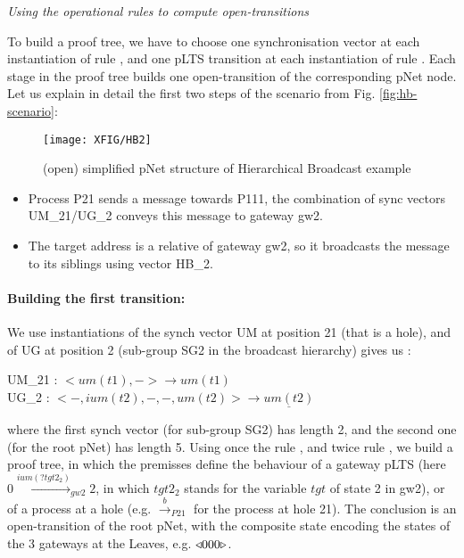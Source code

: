 \documentclass{lncs/llncs}
\newcommand{\TODO}[1]{\textcolor{red}{\textbf{[TODO:#1]}}}
\begin{document}
\begin{example} \emph{Using the operational rules to compute
    open-transitions}
  \label{example:deduction-trees}

To build a proof tree, we have to choose one synchronisation vector at
each instantiation of rule \TrDeux, and one pLTS transition at each
instantiation of rule \TrUn. Each stage in the proof tree builds one
open-transition of the corresponding pNet node.  Let us explain in
detail the first two steps of the
scenario from Fig. \ref{fig:hb-scenario}:

\begin{figure}[h]
\centerline{ \texttt{[image: XFIG/HB2]} }
\caption{(open) simplified pNet structure of Hierarchical Broadcast example}
\label{fig:flattening}
\end{figure}

\begin{itemize}
\item Process P21 sends a message towards P111, the combination of sync vectors UM\_21/UG\_2 conveys this message to gateway gw2.
\item The target address is a relative of gateway gw2, so it
  broadcasts the message to its siblings using vector HB\_2.
\end{itemize}
\end{example}


\paragraph{Building the first transition:}

We use instantiations of the synch vector UM at position 21 (that is a
hole), and of UG at position 2 (sub-group SG2 in the broadcast hierarchy) gives us :
\medskip


\noindent
UM\_21 : $< um(t1), - > \to\!um(t1)$\\
UG\_2 : $< -, ium(t2), -, -, um(t2) > \longrightarrow \underline{um(t2)}$

\smallskip\noindent
where the first synch vector (for sub-group SG2) has length 2, and the
second one (for the root pNet) has length 5. Using once the rule \TrUn,
and twice rule \TrDeux, we build a proof tree, in which the premisses
define the behaviour of a gateway pLTS (here
$0 \xrightarrow{ium(?tgt2_2)}_{gw2} 2$, in which $tgt2_2$ stands for
the variable $tgt$ of state 2 in gw2), or of a process at a hole
(e.g. $\xrightarrow{b}_{P21}$ for the process at hole 21).
The conclusion is an open-transition of the root pNet, with the
composite state encoding the states of the 3 gateways at the Leaves,
e.g. $\triangleleft{000}\triangleright$.
\end{document}
